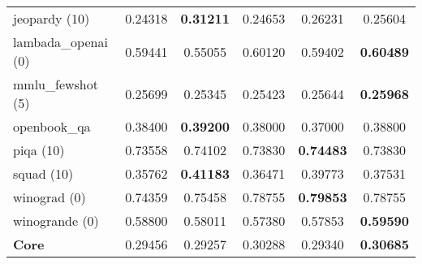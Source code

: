 \begin{table*}[t]
\begin{sc}
{\begin{tabular}{l|ccccc}
jeopardy (10) & 0.24318 & \textbf{0.31211} & 0.24653 & 0.26231 & 0.25604 \\ 
lambada\_openai (0) & 0.59441 & 0.55055 & 0.60120 & 0.59402 & \textbf{0.60489} \\ 
mmlu\_fewshot (5) & 0.25699 & 0.25345 & 0.25423 & 0.25644 & \textbf{0.25968} \\ 
openbook\_qa & 0.38400 & \textbf{0.39200} & 0.38000 & 0.37000 & 0.38800 \\ 
piqa (10) & 0.73558 & 0.74102 & 0.73830 & \textbf{0.74483} & 0.73830 \\ 
squad (10) & 0.35762 & \textbf{0.41183} & 0.36471 & 0.39773 & 0.37531 \\ 
winograd (0) & 0.74359 & 0.75458 & 0.78755 & \textbf{0.79853} & 0.78755 \\ 
winogrande (0) & 0.58800 & 0.58011 & 0.57380 & 0.57853 & \textbf{0.59590} \\ 
\textbf{Core} & 0.29456 & 0.29257 & 0.30288 & 0.29340 & \textbf{0.30685} \\
    \bottomrule
    \end{tabular}
  }
  \end{sc}
\end{table*}